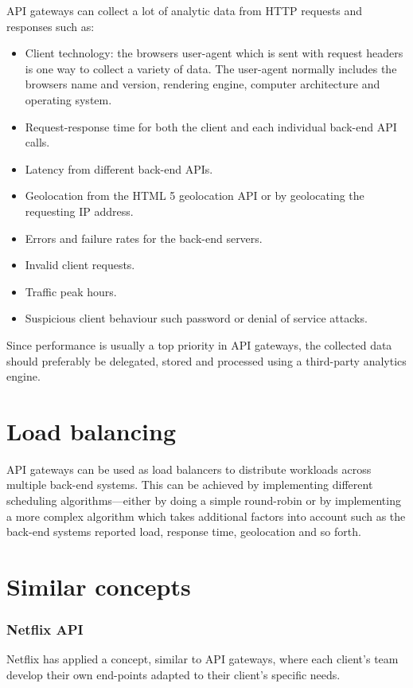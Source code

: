 \documentclass{cslthse-msc}
\begin{document}
\vspace{5mm}

\noindent API gateways can collect a lot of analytic data from HTTP requests and responses such as:
\begin{itemize}
	\item Client technology: the browsers user-agent which is sent with request headers is one way to collect a variety of data. The user-agent normally includes the browsers name and version, rendering engine, computer architecture and operating system.
	\item Request-response time for both the client and each individual back-end API calls.
	\item Latency from different back-end APIs.
	\item Geolocation from the HTML 5 geolocation API \cite{html5_geolocation} or by geolocating the requesting IP address.
	\item Errors and failure rates for the back-end servers.
	\item Invalid client requests.
	\item Traffic peak hours.
	\item Suspicious client behaviour such password or denial of service attacks.
\end{itemize}

\noindent Since performance is usually a top priority in API gateways, the collected data should preferably be delegated, stored and processed using a third-party analytics engine.

\section{Load balancing}
API gateways can be used as load balancers to distribute workloads across multiple back-end systems. This can be achieved by implementing different scheduling algorithms---either by doing a simple round-robin or by implementing a more complex algorithm which takes additional factors into account such as the back-end systems reported load, response time, geolocation and so forth.

\section{Similar concepts}
\label{similar_concepts}
\subsubsection{Netflix API}
Netflix has applied a concept, similar to API gateways, where each client's team develop their own end-points adapted to their client's specific needs.
\end{document}
